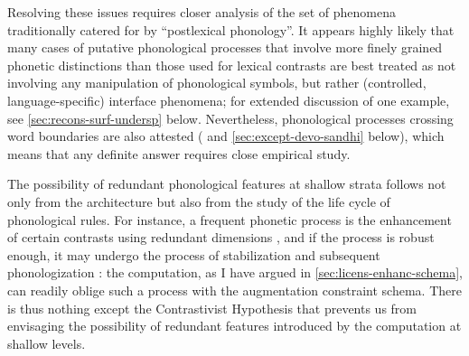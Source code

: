 Resolving these issues requires closer analysis of the set of phenomena traditionally catered for by \enquote{postlexical phonology}. It appears highly likely that many cases of putative phonological processes that involve more finely grained phonetic distinctions than those used for lexical contrasts are best treated as not involving any manipulation of phonological symbols, but rather (controlled, language\hyp specific) interface phenomena; for extended discussion of one example, see \cref{sec:recons-surf-undersp} below. Nevertheless, phonological processes crossing word boundaries are also attested (\cf \citealp{scobbieladd} and \cref{sec:except-devo-sandhi} below), which means that any definite answer requires close empirical study.

The possibility of redundant phonological features at shallow strata follows not only from the architecture but also from the study of the life cycle of phonological rules. For instance, a frequent phonetic process is the enhancement of certain contrasts using redundant dimensions \citep{stevens89:_primar_featur_their_enhan_conson,stevens10:_quant,keyser06:_enhan_overl_speec_chain}, and if the process is robust enough, it may undergo the process of stabilization and subsequent phonologization \citep[\cfm][]{bermudez-oterong:_cycles}: the computation, as I have argued in \cref{sec:licens-enhanc-schema}, can readily oblige such a process with the augmentation constraint schema. There is thus nothing except the Contrastivist Hypothesis that prevents us from envisaging the possibility of redundant features introduced by the computation at shallow levels.

